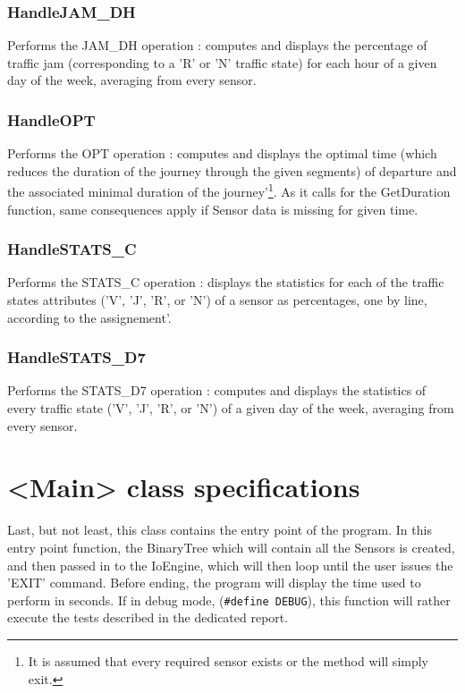 \documentclass[10pt]{article}
\begin{document}
\subsubsection*{HandleJAM\_DH}
Performs the JAM\_DH operation : computes and displays the percentage of traffic jam (corresponding to a 'R' or 'N' traffic state) for each hour of a given day of the week, averaging from every sensor\footnotemark[2].

\subsubsection*{HandleOPT}
Performs the OPT operation : computes and displays the optimal time (which reduces the duration of the journey through the given segments) of departure and the associated minimal duration of the journey\footnotemark[2]'\footnote{ It is assumed that every required sensor exists or the method will simply exit.}. As it calls for the GetDuration function, same consequences apply if Sensor data is missing for given time.

\subsubsection*{HandleSTATS\_C}
Performs the STATS\_C operation : displays the statistics for each of the traffic states attributes ('V', 'J', 'R', or 'N') of a sensor as percentages, one by line, according to the assignement\footnotemark[2]'\footnotemark[3].

\subsubsection*{HandleSTATS\_D7}
Performs the STATS\_D7 operation : computes and displays the statistics of every traffic state ('V', 'J', 'R', or 'N') of a given day of the week, averaging from every sensor\footnotemark[2].

\section{<Main> class specifications}
Last, but not least, this class contains the entry point of the program. In this entry point function, the BinaryTree which will contain all the Sensors is created, and then passed in to the IoEngine, which will then loop until the user issues the 'EXIT' command. Before ending, the program will display the time used to perform in seconds.
If in debug mode, (\texttt{\#define DEBUG}), this function will rather execute the tests described in the dedicated report.
\end{document}
